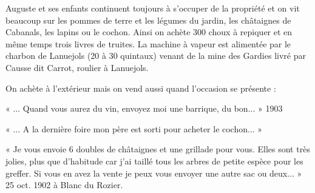 Auguste et ses enfants continuent toujours à s’occuper de la propriété et on vit beaucoup sur
les pommes de terre et les légumes du jardin, les châtaignes de Cabanals, les lapins ou le
cochon. Ainsi on achète 300 choux à repiquer et en même temps trois livres de truites.
La machine à vapeur est alimentée par le charbon de Lanuejols (20 à 30 quintaux) venant de
la mine des Gardies livré par Causse dit Carrot, roulier à Lanuejols.

On achète à l’extérieur mais on vend aussi quand l’occasion se présente :

« ... Quand vous aurez du vin, envoyez moi une barrique, du bon... » 1903

« ... A la dernière foire mon père est sorti pour acheter le cochon... »

« Je vous envoie 6 doubles de châtaignes et une grillade pour vous. Elles sont très jolies,
plus que d’habitude car j’ai taillé tous les arbres de petite espèce pour les greffer. Si vous en
avez la vente je peux vous envoyer une autre sac ou deux... » 25 oct. 1902 à Blanc du Rozier.
